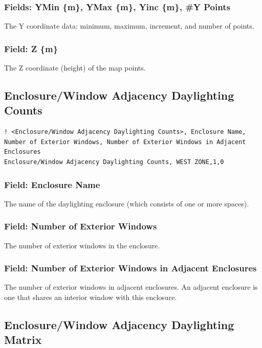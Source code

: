 \subsubsection{Fields: YMin \{m\}, YMax \{m\}, Yinc \{m\}, #Y Points}\label{field-maps-ycoords}
The Y coordinate data: minimum, maximum, increment, and number of points.

\subsubsection{Field: Z \{m\}}\label{field-maps-z}
The Z coordinate (height) of the map points.

\subsection{Enclosure/Window Adjacency Daylighting Counts}\label{daylighting-adjacency-counts}

\begin{lstlisting}
! <Enclosure/Window Adjacency Daylighting Counts>, Enclosure Name, Number of Exterior Windows, Number of Exterior Windows in Adjacent Enclosures
Enclosure/Window Adjacency Daylighting Counts, WEST ZONE,1,0
\end{lstlisting}

\subsubsection{Field: Enclosure Name}\label{field-daylighting-counts-enclosurename}
The name of the daylighting enclosure (which consists of one or more spaces).

\subsubsection{Field: Number of Exterior Windows}\label{field-daylighting-counts-num-ext-windows}
The number of exterior windows in the enclosure.

\subsubsection{Field: Number of Exterior Windows in Adjacent Enclosures}\label{field-daylighting-counts-num-ext-windows-adj-encl}
The number of exterior windows in adjacent enclosures. An adjacent enclosure is one that shares an interior window with this enclosure.


\subsection{Enclosure/Window Adjacency Daylighting Matrix}\label{daylighting-adjacency-matrix}


